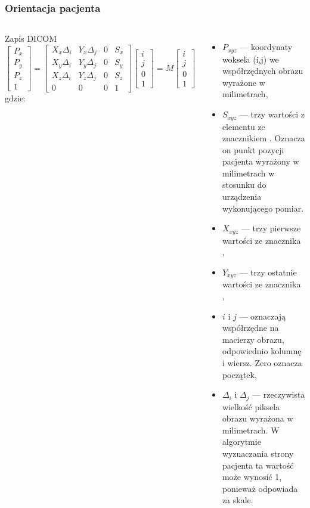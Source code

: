 \documentclass[aspectratio=169]{beamer}
\begin{document}
\begin{frame}[t]
    \frametitle{Orientacja pacjenta}
    \begin{columns}[t]

        Zapis DICOM
        \tiny
        \[
            \begin{bmatrix}
                P_x \\ P_y \\ P_z \\ 1
            \end{bmatrix}
            =
            \begin{bmatrix}
                X_x\Delta_i & Y_x\Delta_j & 0 & S_x \\
                X_y\Delta_i & Y_y\Delta_j & 0 & S_y \\
                X_z\Delta_i & Y_z\Delta_j & 0 & S_z \\
                0           & 0           & 0 & 1
            \end{bmatrix}
            \begin{bmatrix}
                i \\ j \\ 0 \\ 1
            \end{bmatrix}
            =
            M
            \begin{bmatrix}
                i \\ j \\ 0 \\ 1
            \end{bmatrix}
        \]
        gdzie:
        \begin{itemize}
            \item $P_{xyz}$ --- koordynaty woksela (i,j) we współrzędnych obrazu wyrażone w milimetrach,
            \item $S_{xyz}$ --- trzy wartości z elementu ze znacznikiem . Oznacza on punkt pozycji pacjenta wyrażony w milimetrach w stosunku do urządzenia wykonującego pomiar.
            \item $X_{xyz}$ --- trzy pierwsze wartości ze znacznika ,
            \item $Y_{xyz}$ --- trzy ostatnie wartości ze znacznika ,
            \item $i$ i $j$ --- oznaczają współrzędne na macierzy obrazu, odpowiednio kolumnę i wiersz. Zero oznacza początek,
            \item $\Delta_i$ i $\Delta_j$ --- rzeczywista wielkość piksela obrazu wyrażona w milimetrach.
                  W algorytmie wyznaczania strony pacjenta ta wartość może wynosić 1, ponieważ odpowiada za skale.
        \end{itemize}


\end{columns}
\end{frame}
\end{document}
